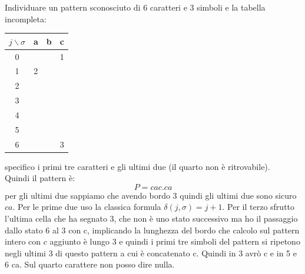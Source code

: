 \documentclass[a4paper,12pt, oneside]{book}
\begin{document}
\begin{esempio}
  Individuare un pattern sconosciuto di 6 caratteri e 3 simboli e la tabella
  incompleta:
  \begin{table}[H]
    \centering
    \begin{tabular}[H]{c||c|c|c}
      $j\backslash\sigma$ & a & b & c \\
      \hline
      \hline
      0 &  &    & 1\\
      1 & 2 &    & \\
      2 &  &    & \\
      3 &  &    & \\
      4 &  &    & \\ 
      5 &  &    & \\
      6 &  &    & 3  
    \end{tabular}
  \end{table}
  specifico i primi tre caratteri e gli ultimi due (il quarto non è
  ritrovabile).\\
  Quindi il pattern è:
  \[P=cac.ca\]
  per gli ultimi due sappiamo che avendo bordo 3 quindi gli ultimi due sono
  sicuro $ca$. Per le prime due uso la classica formula
  $\delta(j,\sigma)=j+1$. Per il terzo sfrutto l'ultima cella che ha segnato 3,
  che non è uno stato successivo ma ho il passaggio dallo stato 6 al 3 con c,
  implicando la lunghezza del bordo che calcolo sul pattern intero con $c$
  aggiunto è lungo 3 e quindi i primi tre simboli del pattern si ripetono negli
  ultimi 3 di questo pattern a cui è concatenato c. Quindi in 3 avrò c e in 5 e
  6 ca. Sul quarto carattere non posso dire nulla.
\end{esempio}
\end{document}
